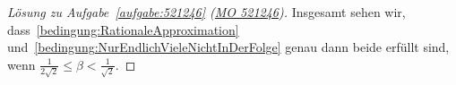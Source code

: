 \begin{proof}[Lösung zu Aufgabe~\ref{aufgabe:521246} \textmd{(\href{https://www.mathematik-olympiaden.de/moev/index.php?option=com_download&thema=a&datei=A52124b.pdf&format=raw}{MO 521246})}]
	Insgesamt sehen wir, dass~\ref{bedingung:RationaleApproximation} und~\ref{bedingung:NurEndlichVieleNichtInDerFolge} genau dann beide erfüllt sind, wenn $\frac{1}{2\sqrt{2}}\leqslant \beta<\frac{1}{\sqrt{2}}$.
\end{proof}